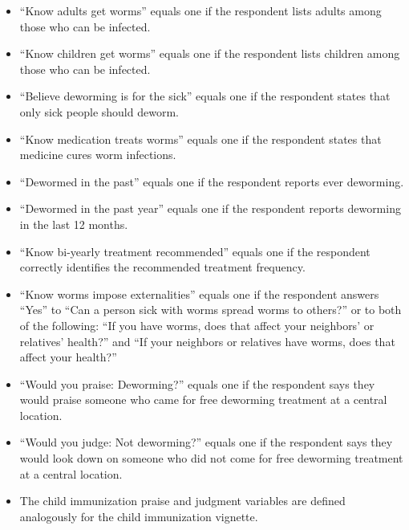 \documentclass[ECM\space ReStud.tex]{subfiles}
\begin{document}
\begin{table}[ht!]
\begin{threeparttable}
{\begin{minipage}{\linewidth}
    \begin{itemize}\setlength\itemsep{0.2em}
  \item ``Know adults get worms'' equals one if the respondent lists adults among those who can be infected.
  \item ``Know children get worms'' equals one if the respondent lists children among those who can be infected.
  \item ``Believe deworming is for the sick'' equals one if the respondent states that only sick people should deworm.
  \item ``Know medication treats worms'' equals one if the respondent states that medicine cures worm infections.
  \item ``Dewormed in the past'' equals one if the respondent reports ever deworming.
  \item ``Dewormed in the past year'' equals one if the respondent reports deworming in the last 12 months.
  \item ``Know bi-yearly treatment recommended'' equals one if the respondent correctly identifies the recommended treatment frequency.
  \item ``Know worms impose externalities'' equals one if the respondent answers ``Yes'' to ``Can a person sick with worms spread worms to others?'' or to both of the following: ``If you have worms, does that affect your neighbors' or relatives' health?'' and ``If your neighbors or relatives have worms, does that affect your health?''
  \item ``Would you praise: Deworming?'' equals one if the respondent says they would praise someone who came for free deworming treatment at a central location.
  \item ``Would you judge: Not deworming?'' equals one if the respondent says they would look down on someone who did not come for free deworming treatment at a central location.
  \item The child immunization praise and judgment variables are defined analogously for the child immunization vignette.
\end{itemize}
\end{minipage}}
\end{threeparttable}
\end{table}

\newpage

\newcommand{\samplesubhead}[1]{%
  \par\addvspace{0.45\baselineskip}%
  \noindent\emph{#1}\par\nopagebreak\noindent
}
\end{document}
